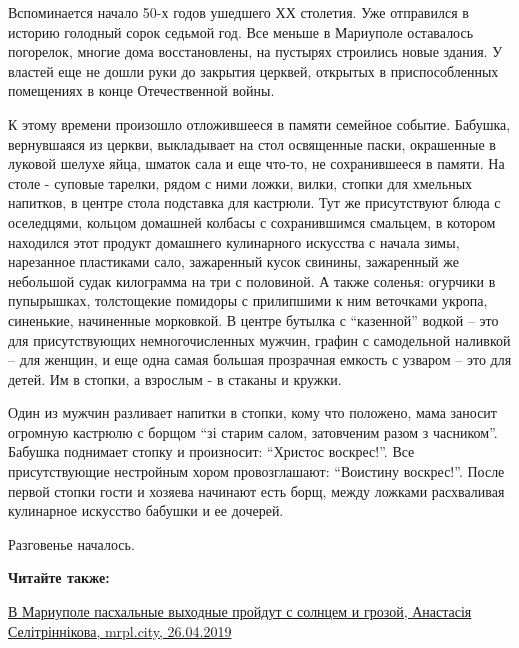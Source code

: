 Вспоминается начало 50-х годов ушедшего ХХ столетия. Уже отправился в историю
голодный сорок седьмой год. Все меньше в Мариуполе оставалось погорелок, многие
дома восстановлены, на пустырях строились новые здания. У властей еще не дошли
руки до закрытия церквей, открытых в приспособленных помещениях в конце
Отечественной войны.

К этому времени произошло отложившееся в памяти семейное событие. Бабушка,
вернувшаяся из церкви, выкладывает на стол освященные паски, окрашенные в
луковой шелухе яйца, шматок сала и еще что-то, не сохранившееся в памяти. На
столе - суповые тарелки, рядом с ними ложки, вилки, стопки для хмельных
напитков, в центре стола подставка для кастрюли. Тут же присутствуют блюда с
оселедцями, кольцом домашней колбасы с сохранившимся смальцем, в котором
находился этот продукт домашнего кулинарного искусства с начала зимы,
нарезанное пластиками сало, зажаренный кусок свинины, зажаренный же небольшой
судак килограмма на три с половиной. А также соленья: огурчики в пупырышках,
толстощекие помидоры с прилипшими к ним веточками укропа, синенькие, начиненные
морковкой. В центре бутылка с \enquote{казенной} водкой – это для
присутствующих немногочисленных мужчин, графин с самодельной наливкой – для
женщин, и еще одна самая большая прозрачная емкость с узваром – это для детей.
Им в стопки, а взрослым - в стаканы и кружки.

Один из мужчин разливает напитки в стопки, кому что положено, мама заносит
огромную кастрюлю с борщом \enquote{зі старим салом, затовченим разом з часником}.
Бабушка поднимает стопку и произносит: \enquote{Христос воскрес!}. Все присутствующие
нестройным хором провозглашают: \enquote{Воистину воскрес!}. После первой стопки гости
и хозяева начинают есть борщ, между ложками расхваливая кулинарное искусство
бабушки и ее дочерей.

Разговенье началось.

\textbf{Читайте также:} 

\href{https://mrpl.city/news/view/v-mariupole-pashalnye-vyhodnye-projdut-s-solntsem-i-grozoj}{%
В Мариуполе пасхальные выходные пройдут с солнцем и грозой, Анастасія Селітріннікова, mrpl.city, 26.04.2019}
